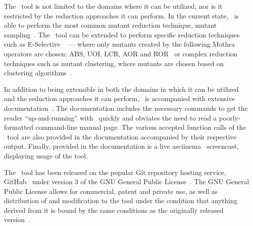 The \mr~tool is not limited to the domains where it can be utilized, nor is it restricted
by the reduction approaches it can perform. In the current state, \mr~is able to perform
the most common mutant reduction technique, mutant sampling~\cite{gopinath2015mutation, jia2011analysis, gopinath2015empirical}.
The \mr~tool can be extended to perform specific reduction techniques such as E-Selective
~\cite{offutt1996experimental} --- where only mutants created by the following Mothra operators
are chosen: ABS, UOI, LCR, AOR and ROR~\cite{gopinath2015empirical} or complex reduction techniques
such as mutant clustering, where mutants are chosen based on clustering algorithms~\cite{jia2011analysis}.

In addition to being extensible in both the domains in which it can be utilized and the
reduction approaches it can perform, \mr~is accompanied with extensive documentation~\cite{tool}.
The documentation includes the necessary commands to get the reader ``up-and-running''
with \mr~quickly and obviates the need to read a poorly-formatted command-line manual page.
The various accepted function calls of the \mr~tool are also provided in the documentation
accompanied by their respective output. Finally, provided in the documentation is a live
asciinema~\cite{asciinema} screencast, displaying usage of the tool.

The \mr~tool has been released on the popular Git repository hosting service, GitHub~\cite{github}
under version 3 of the GNU General Public License~\cite{license}. The GNU General Public License
allows for commercial, patent and private use, as well as distribution of and modification to the tool
under the condition that anything derived from it is bound by the same conditions as the originally
released version~\cite{copyleft}.

% 
% 
% 
